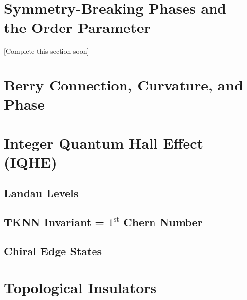 \documentclass[11pt]{article}
\begin{document}
\section{Symmetry-Breaking Phases and the Order Parameter}
[Complete this section soon]

\section{Berry Connection, Curvature, and Phase}

\section{Integer Quantum Hall Effect (IQHE)}

\subsection{Landau Levels}

\subsection{TKNN Invariant = $1^{\text{st}}$ Chern Number}

\subsection{Chiral Edge States}






\section{Topological Insulators}






\newpage
\vskip 0.5cm
\end{document}
